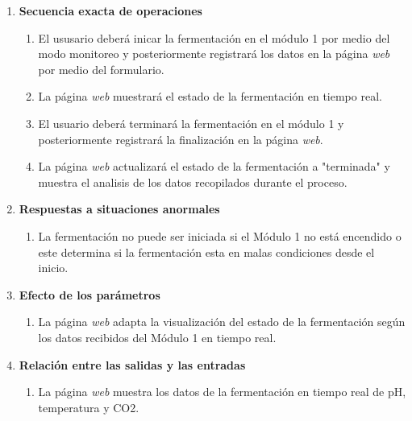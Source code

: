 \begin{enumerate}
\begin{enumerate}
                \item \textbf{Secuencia exacta de operaciones}
                    \begin{enumerate}
                        \item El ususario deberá inicar la fermentación en el módulo 1 por medio del modo monitoreo
                        y posteriormente registrará los datos en la página \textit{web} por medio del formulario.
                        \item La página \textit{web} muestrará el estado de la fermentación en tiempo real.
                        \item El usuario deberá terminará la fermentación en el módulo 1
                        y posteriormente registrará la finalización en la página \textit{web}. 
                        \item La página \textit{web} actualizará el estado de la fermentación a "terminada" y muestra el analisis de los datos recopilados durante el proceso.
                    \end{enumerate}   
            
                \item \textbf{Respuestas a situaciones anormales}
                    \begin{enumerate}
                        \item La fermentación no puede ser iniciada si el Módulo 1 no está encendido o este determina si la fermentación esta en malas condiciones desde el inicio.
                    \end{enumerate}   
        
                \item \textbf{Efecto de los parámetros}
                    \begin{enumerate}
                        \item La página \textit{web} adapta la visualización del estado de la fermentación según los datos recibidos del Módulo 1 en tiempo real.
                    \end{enumerate}   
            
                \item \textbf{Relación entre las salidas y las entradas}
                    \begin{enumerate}
                        \item La página \textit{web} muestra los datos de la fermentación en tiempo real de pH, temperatura y CO2.
                    \end{enumerate}
        \end{enumerate}


\end{enumerate}

